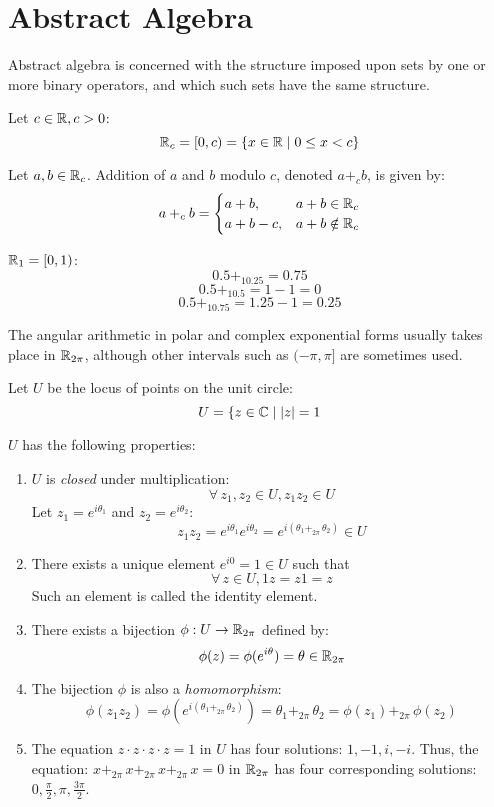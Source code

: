 \documentclass[letterpaper,12pt,fleqn]{article}
\renewcommand{\o}{\theta}
\begin{document}
\section*{Abstract Algebra}
Abstract algebra is concerned with the structure imposed upon sets by one or
more binary operators, and which such sets have the same structure.

\begin{definition}
  Let $c\in\mathbb{R}, c>0$:
  \[\mathbb{R}_c=[0,c)=\{x\in\mathbb{R}\mid0\le x<c\}\]
\end{definition}

\begin{definition}
  Let $a,b\in\mathbb{R}_c$. Addition of $a$ and $b$ modulo $c$, denoted $a+_c b$, is
  given by:
  \[a+_c b=\begin{cases}
  a+b, & a+b\in\mathbb{R}_c \\
  a+b-c, & a+b\notin\mathbb{R}_c \\
  \end{cases}\]
\end{definition}

\begin{example}
  $\mathbb{R}_1=[0,1)$:
  \[0.5+_10.25=0.75\]
  \[0.5+_10.5=1-1=0\]
  \[0.5+_10.75=1.25-1=0.25\]
\end{example}

The angular arithmetic in polar and complex exponential forms usually takes
place in $\mathbb{R}_{2\pi}$, although other intervals such as $(-\pi,\pi]$ are
sometimes used.

Let $U$ be the locus of points on the unit circle:
\[U=\{z\in\mathbb{C}\mid\lvert z\rvert=1\]

$U$ has the following properties:
\begin{enumerate}
\item $U$ is \emph{closed} under multiplication:
  \[\forall\,z_1,z_2\in U, z_1z_2\in U\]
  Let $z_1=e^{i\o_1}$ and $z_2=e^{i\o_2}$:
  \[z_1z_2=e^{i\o_1}e^{i\o_2}=e^{i(\o_1+_{2\pi}\,\o_2)}\in U\]

\item There exists a unique element $e^{i0}=1\in U$ such that
  \[\forall\,z\in U,1z=z1=z\]
  Such an element is called the identity element.

\item There exists a bijection $\phi:U\to\mathbb{R}_{2\pi}$ defined by:
  \[\phi(z)=\phi(e^{i\o})=\o\in\R_{2\pi}\]

\item The bijection $\phi$ is also a \emph{homomorphism}:
  \[\phi(z_1z_2)=\phi\left(e^{i(\o_1+_{2\pi}\,\o_2)}\right)=\o_1+_{2\pi}\,\o_2=
  \phi(z_1)+_{2\pi}\,\phi(z_2)\]

\item The equation $z\cdot z\cdot z\cdot z=1$ in $U$ has four solutions:
  $1,-1,i,-i$. Thus, the equation: $x+_{2\pi}\,x+_{2\pi}\,x+_{2\pi}\,x=0$ in
  $\mathbb{R}_{2\pi}$ has four corresponding solutions:
  $0,\frac{\pi}{2},\pi,\frac{3\pi}{2}$.
\end{enumerate}
\end{document}
